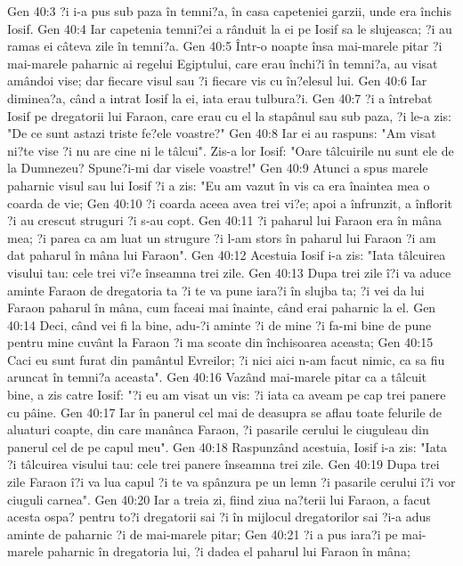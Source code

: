Gen 40:3  ?i i-a pus sub paza în temni?a, în casa capeteniei garzii, unde era închis Iosif.
Gen 40:4  Iar capetenia temni?ei a rânduit la ei pe Iosif sa le slujeasca; ?i au ramas ei câteva zile în temni?a.
Gen 40:5  Într-o noapte însa mai-marele pitar ?i mai-marele paharnic ai regelui Egiptului, care erau închi?i în temni?a, au visat amândoi vise; dar fiecare visul sau ?i fiecare vis cu în?elesul lui.
Gen 40:6  Iar diminea?a, când a intrat Iosif la ei, iata erau tulbura?i.
Gen 40:7  ?i a întrebat Iosif pe dregatorii lui Faraon, care erau cu el la stapânul sau sub paza, ?i le-a zis: "De ce sunt astazi triste fe?ele voastre?"
Gen 40:8  Iar ei au raspuns: "Am visat ni?te vise ?i nu are cine ni le tâlcui". Zis-a lor Iosif: "Oare tâlcuirile nu sunt ele de la Dumnezeu? Spune?i-mi dar visele voastre!"
Gen 40:9  Atunci a spus marele paharnic visul sau lui Iosif ?i a zis: "Eu am vazut în vis ca era înaintea mea o coarda de vie;
Gen 40:10  ?i coarda aceea avea trei vi?e; apoi a înfrunzit, a înflorit ?i au crescut struguri ?i s-au copt.
Gen 40:11  ?i paharul lui Faraon era în mâna mea; ?i parea ca am luat un strugure ?i l-am stors în paharul lui Faraon ?i am dat paharul în mâna lui Faraon".
Gen 40:12  Acestuia Iosif i-a zis: "Iata tâlcuirea visului tau: cele trei vi?e înseamna trei zile.
Gen 40:13  Dupa trei zile î?i va aduce aminte Faraon de dregatoria ta ?i te va pune iara?i în slujba ta; ?i vei da lui Faraon paharul în mâna, cum faceai mai înainte, când erai paharnic la el.
Gen 40:14  Deci, când vei fi la bine, adu-?i aminte ?i de mine ?i fa-mi bine de pune pentru mine cuvânt la Faraon ?i ma scoate din închisoarea aceasta;
Gen 40:15  Caci eu sunt furat din pamântul Evreilor; ?i nici aici n-am facut nimic, ca sa fiu aruncat în temni?a aceasta".
Gen 40:16  Vazând mai-marele pitar ca a tâlcuit bine, a zis catre Iosif: "?i eu am visat un vis: ?i iata ca aveam pe cap trei panere cu pâine.
Gen 40:17  Iar în panerul cel mai de deasupra se aflau toate felurile de aluaturi coapte, din care manânca Faraon, ?i pasarile cerului le ciuguleau din panerul cel de pe capul meu".
Gen 40:18  Raspunzând acestuia, Iosif i-a zis: "Iata ?i tâlcuirea visului tau: cele trei panere înseamna trei zile.
Gen 40:19  Dupa trei zile Faraon î?i va lua capul ?i te va spânzura pe un lemn ?i pasarile cerului î?i vor ciuguli carnea".
Gen 40:20  Iar a treia zi, fiind ziua na?terii lui Faraon, a facut acesta ospa? pentru to?i dregatorii sai ?i în mijlocul dregatorilor sai ?i-a adus aminte de paharnic ?i de mai-marele pitar;
Gen 40:21  ?i a pus iara?i pe mai-marele paharnic în dregatoria lui, ?i dadea el paharul lui Faraon în mâna;
